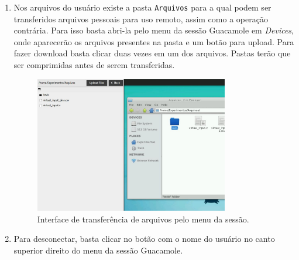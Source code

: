 \documentclass[12pt]{article}
\begin{document}
\begin{enumerate}[font=\bfseries]
    \item Nos arquivos do usuário existe a pasta \verb|Arquivos| para a qual podem ser transferidos arquivos pessoais para uso remoto, assim como a operação contrária. Para isso basta abri-la pelo menu da sessão Guacamole em \textit{Devices}, onde aparecerão os arquivos presentes na pasta e um botão para upload. Para fazer download basta clicar duas vezes em um dos arquivos. Pastas terão que ser comprimidas antes de serem transferidas.
    
    \begin{figure}[H]
    \centering
    \includegraphics[width=0.8\textwidth]{img/trans-guaca.jpg}
    \caption{\label{ref:trans-guaca}Interface de transferência de arquivos pelo menu da sessão.}
    \end{figure}
    
    \item Para desconectar, basta clicar no botão com o nome do usuário no canto superior direito do menu da sessão Guacamole.
\end{enumerate}
\end{document}

